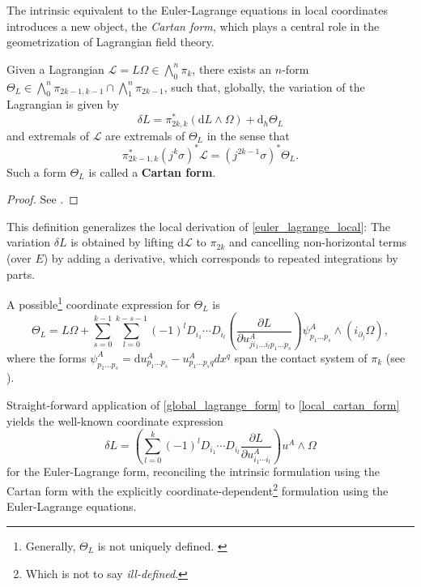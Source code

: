 The intrinsic equivalent to the Euler-Lagrange equations in local coordinates introduces a new object, the \emph{Cartan form}, which plays a central role in the geometrization of Lagrangian field theory.
\begin{proposition}
  Given a Lagrangian $\mathscr L = L\Omega \in \bigwedge^n_0\pi_k$, there exists an $n$-form $\Theta_L\in\bigwedge^{n}_0\pi_{2k-1,k-1}\cap\bigwedge^{n}_{1}\pi_{2k-1}$, such that, globally, the variation of the Lagrangian is given by
  \begin{equation}\label{global_lagrange_form}
    \delta L = \pi^\ast_{2k,k} \left( \mathrm dL\wedge\Omega\right) + \mathrm d_h \Theta_L
  \end{equation}
  and extremals of $\mathscr L$ are extremals of $\Theta_L$ in the sense that
  \begin{equation}
    \pi_{2k-1,k}^\ast (j^k\sigma)^\ast\mathscr L = (j^{2k-1}\sigma)^\ast\Theta_L.
  \end{equation}
  Such a form $\Theta_L$ is called a \textbf{Cartan form}.
\end{proposition}
\begin{proof}
  See \cite{Saunders_1989}.
\end{proof}

This definition generalizes the local derivation of \eqref{euler_lagrange_local}: The variation $\delta L$ is obtained by lifting $\mathrm d\mathscr L$ to $\pi_{2k}$ and cancelling non-horizontal terms (over $E$) by adding a derivative, which corresponds to repeated integrations by parts.

A possible\footnote{Generally, $\Theta_L$ is not uniquely defined. \cite{Saunders_1989}} coordinate expression for $\Theta_L$ is \cite{Saunders_1989}
\begin{equation}\label{local_cartan_form}
  \Theta_L = L\Omega + \sum_{s=0}^{k-1} \sum_{l=0}^{k-s-1} (-1)^l D_{i_1} \cdots D_{i_l} \left(\frac{\partial L}{\partial u^A_{j i_1 \dots i_{l} p_1 \dots p_s}}\right) \psi^A_{p_1\dots p_s} \wedge \left(i_{\partial_j}\Omega\right),
\end{equation}
where the forms $\psi^A_{p_1\dots p_s} = \mathrm d u^A_{p_1\dots p_s} - u^A_{p_1\dots p_sq} dx^q$ span the contact system of $\pi_k$ (see \cite{Saunders_1989}).

Straight-forward application of \eqref{global_lagrange_form} to \eqref{local_cartan_form} yields the well-known coordinate expression
\begin{equation}
  \delta L = \left( \sum_{l=0}^{k} (-1)^l D_{i_1} \cdots D_{i_l} \frac{\partial L}{\partial u^A_{i_1\cdots i_l}}\right) u^A \wedge \Omega
\end{equation}
for the Euler-Lagrange form, reconciling the intrinsic formulation using the Cartan form with the explicitly coordinate-dependent\footnote{Which is not to say \emph{ill-defined}.} formulation using the Euler-Lagrange equations.

